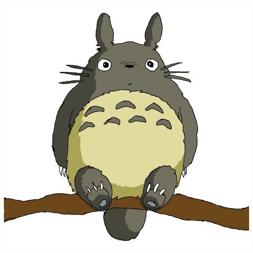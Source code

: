\documentclass[a4paper]{article}
\begin{document}
\includegraphics[scale=0.2]{totoro.png}
\end{document}
